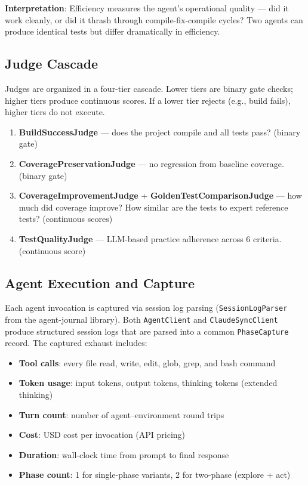 \documentclass[11pt,a4paper]{article}
\begin{document}
\textbf{Interpretation}: Efficiency measures the agent's operational quality ---
did it work cleanly, or did it thrash through compile-fix-compile cycles?
Two agents can produce identical tests but differ dramatically in efficiency.

\subsection{Judge Cascade}

Judges are organized in a four-tier cascade. Lower tiers are binary gate checks;
higher tiers produce continuous scores. If a lower tier rejects (e.g., build fails),
higher tiers do not execute.

\begin{enumerate}[label=\textbf{Tier \arabic*:}, leftmargin=3cm]
  \item[Tier 0:] \textbf{BuildSuccessJudge} --- does the project compile and all tests pass? (binary gate)
  \item[Tier 1:] \textbf{CoveragePreservationJudge} --- no regression from baseline coverage. (binary gate)
  \item[Tier 2:] \textbf{CoverageImprovementJudge} + \textbf{GoldenTestComparisonJudge} --- how much did coverage improve? How similar are the tests to expert reference tests? (continuous scores)
  \item[Tier 3:] \textbf{TestQualityJudge} --- LLM-based practice adherence across 6 criteria. (continuous score)
\end{enumerate}

\subsection{Agent Execution and Capture}

Each agent invocation is captured via session log parsing (\texttt{SessionLogParser}
from the agent-journal library). Both \texttt{AgentClient} and \texttt{ClaudeSyncClient}
produce structured session logs that are parsed into a common \texttt{PhaseCapture}
record. The captured exhaust includes:

\begin{itemize}
  \item \textbf{Tool calls}: every file read, write, edit, glob, grep, and bash command
  \item \textbf{Token usage}: input tokens, output tokens, thinking tokens (extended thinking)
  \item \textbf{Turn count}: number of agent--environment round trips
  \item \textbf{Cost}: USD cost per invocation (API pricing)
  \item \textbf{Duration}: wall-clock time from prompt to final response
  \item \textbf{Phase count}: 1 for single-phase variants, 2 for two-phase (explore + act)
\end{itemize}
\end{document}
